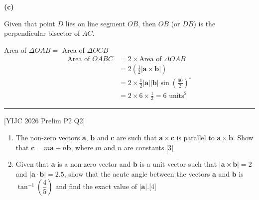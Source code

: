 \documentclass[a4paper,11pt,oneside]{book}
\newcounter{wq}[section]
\newcommand{\Q}[1]{\par\needspace{5\baselineskip}\medskip\stepcounter{wq}\noindent\textbf{\thewq}\quad #1\par}
\begin{document}
\par\smallskip\noindent\textbf{(c)}\par\nopagebreak{}Given that point $D$ lies on line segment $OB$, then $OB$ (or $DB$) is the perpendicular bisector of $AC$.\begin{center}\end{center}Area of $\Delta OAB=$ Area of $\Delta OCB$\begin{align*}\text{Area of }OABC&=2\times\text{Area of }\Delta OAB\\ &=2\left(\tfrac12|\mathbf a\times\mathbf b|\right)\\ &=2\times\tfrac12|\mathbf a||\mathbf b|\sin\left(\tfrac{60}{2}\right)^\circ\\ &=2\times6\times\tfrac12=6\text{ units}^2\end{align*}
\par\medskip\hrule\medskip
\Q{\textcolor{black!60}{\small[YIJC 2026 Prelim P2 Q2]}\par\smallskip \begin{enumerate}[label=\textbf{(\alph*)},leftmargin=2.2em,itemsep=3pt]\item The non-zero vectors $\mathbf a$, $\mathbf b$ and $\mathbf c$ are such that $\mathbf a\times\mathbf c$ is parallel to $\mathbf a\times\mathbf b$. Show that $\mathbf c=m\mathbf a+n\mathbf b$, where $m$ and $n$ are constants.\hfill[3]\item Given that $\mathbf a$ is a non-zero vector and $\mathbf b$ is a unit vector such that $|\mathbf a\times\mathbf b|=2$ and $|\mathbf a\cdot\mathbf b|=2.5$, show that the acute angle between the vectors $\mathbf a$ and $\mathbf b$ is $\tan^{-1}\left(\dfrac45\right)$ and find the exact value of $|\mathbf a|$.\hfill[4]\end{enumerate}}
\end{document}
